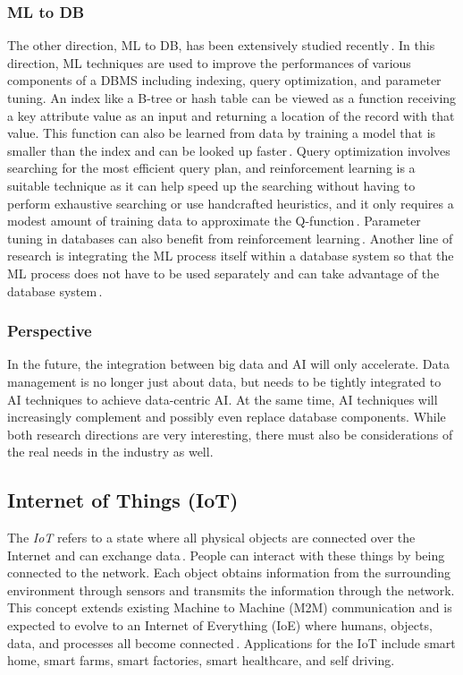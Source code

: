 \documentclass[11pt]{article}
\begin{document}
\subsubsection{ML to DB}
The other direction, ML to DB, has been extensively studied recently\,\cite{DBLP:journals/debu/KraskaM0PPRS21}. In this direction, ML techniques are used to improve the performances of various components of a DBMS including indexing, query optimization, and parameter tuning. An index like a B-tree or hash table can be viewed as a function receiving a key attribute value as an input and returning a location of the record with that value. This function can also be learned from data by training a model that is smaller than the index and can be looked up faster\,\cite{DBLP:conf/sigmod/DingMYWDLZCGKLK20}. Query optimization involves searching for the most efficient query plan, and reinforcement learning is a suitable technique as it can help speed up the searching without having to perform exhaustive searching or use handcrafted heuristics, and it only requires a modest amount of training data to approximate the Q-function\,\cite{DBLP:journals/pvldb/MarcusNMZAKPT19}. Parameter tuning in databases can also benefit from reinforcement learning\,\cite{DBLP:journals/pvldb/LiZLG19}. Another line of research is integrating the ML process itself within a database system so that the ML process does not have to be used separately and can take advantage of the database system\,\cite{DBLP:conf/icde/ChaudhuriFB99,DBLP:conf/cidr/BoehmADGIKLPR20}.

\subsubsection{Perspective}
In the future, the integration between big data and AI will only accelerate. Data management is no longer just about data, but needs to be tightly integrated to AI techniques to achieve data-centric AI. At the same time, AI techniques will increasingly complement and possibly even replace database components. While both research directions are very interesting, there must also be considerations of the real needs in the industry as well.

\subsection{Internet of Things (IoT)}
The \emph{IoT} refers to a state where all physical objects are connected over the Internet and can exchange data\,\cite{iot}. People can interact with these things by being connected to the network. Each object obtains information from the surrounding environment through sensors and transmits the information through the network. This concept extends existing Machine to Machine (M2M) communication and is expected to evolve to an Internet of Everything (IoE) where humans, objects, data, and processes all become connected\,\cite{ioe}. Applications for the IoT include smart home, smart farms, smart factories, smart healthcare, and self driving.
\end{document}
